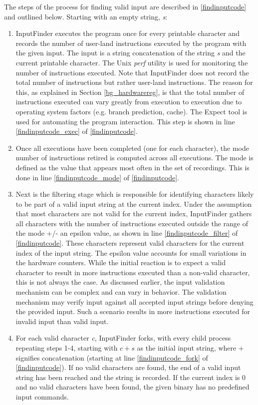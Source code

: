 \documentclass{acm_proc_article-sp}
\def \tool {InputFinder}
\begin{document}
The steps of the process for finding valid input are described in \autoref{findinputcode} and outlined below. Starting with an empty string, \textit{s}:
\begin{enumerate}
\item \tool{} executes the program once for every printable character and records the number of user-land instructions executed by the program with the given input. The input is a string concatenation of the string \textit{s} and the current printable character. The Unix \textit{perf} utility is used for monitoring the number of instructions executed. Note that \tool{} does not record the total number of instructions but rather user-land instructions. The reason for this, as explained in Section \ref{bg_hardwarereg}, is that the total number of instructions executed can vary greatly from execution to execution due to operating system factors (e.g. branch prediction, cache). The Expect tool is used for automating the program interaction. This step is shown in line \autoref{findinputcode_exec} of \autoref{findinputcode}.
\item Once all executions have been completed (one for each character), the mode number of instructions retired is computed across all executions. The mode is defined as the value that appears most often in the set of recordings. This is done in line \autoref{findinputcode_mode} of \autoref{findinputcode}.
\item Next is the filtering stage which is responsible for identifying characters likely to be part of a valid input string at the current index. Under the assumption that most characters are not valid for the current index, \tool{} gathers all characters with the number of instructions executed outside the range of the mode +/- an epsilon value, as shown in line \autoref{findinputcode_filter} of \autoref{findinputcode}. These characters represent valid characters for the current index of the input string. The epsilon value accounts for small variations in the hardware counters. While the initial reaction is to expect a valid character to result in more instructions executed than a non-valid character, this is not always the case. As discussed earlier, the input validation mechanism can be complex and can vary in behavior. The validation mechanism may verify input against all accepted input strings before denying the provided input. Such a scenario results in more instructions executed for invalid input than valid input.
\item For each valid character \textit{c}, \tool{} forks, with every child process repeating steps 1-4, starting with $ c + s $ as the initial input string, where $+$ signifies concatenation (starting at line \autoref{findinputcode_fork} of \autoref{findinputcode}). If no valid characters are found, the end of a valid input string has been reached and the string is recorded. If the current index is 0 and no valid characters have been found, the given binary has no predefined input commands.
\end{enumerate}
\end{document}
